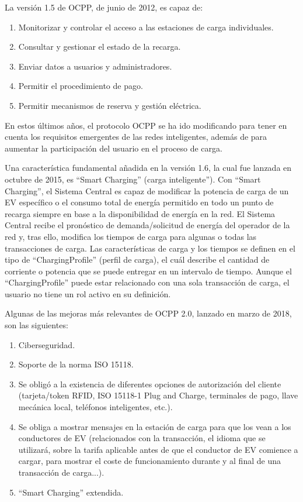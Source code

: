 \documentclass[12pt,a4paper,onecolumn,oneside]{report}
\begin{document}
La versión 1.5 de OCPP, de junio de 2012, es capaz de:

\begin{enumerate}

\item Monitorizar y controlar el acceso a las estaciones de carga individuales.
\item Consultar y gestionar el estado de la recarga.
\item Enviar datos a usuarios y administradores.
\item Permitir el procedimiento de pago.
\item Permitir mecanismos de reserva y gestión eléctrica.

\end{enumerate}

En estos últimos años, el protocolo OCPP se ha ido modificando para tener en cuenta los requisitos emergentes de las redes inteligentes, además de para aumentar la participación del usuario en el proceso de carga.

Una característica fundamental añadida en la versión 1.6, la cual fue lanzada en octubre de 2015, es ``Smart Charging” (carga inteligente”). Con ``Smart Charging”,  el Sistema Central es capaz de modificar la potencia de carga de un EV específico o el consumo total de energía permitido en todo un punto de recarga siempre en base a la disponibilidad de energía en la red. El Sistema Central recibe el pronóstico de demanda/solicitud de energía del operador de la red y, tras ello, modifica los tiempos de carga para algunas o todas las transacciones de carga. Las características de carga y los tiempos se definen en el tipo de ``ChargingProfile” (perfil de carga), el cuál describe el cantidad de corriente o potencia que se puede entregar en un intervalo de tiempo. Aunque el ``ChargingProfile” puede estar relacionado con una sola transacción de carga, el usuario no tiene un rol activo en su definición.

Algunas de las mejoras más relevantes de OCPP 2.0, lanzado en marzo de 2018, son las siguientes:

\begin{enumerate}

\item Ciberseguridad.
\item Soporte de la norma ISO 15118.
\item Se obligó a la existencia de diferentes opciones de autorización del cliente (tarjeta/token RFID, ISO 15118-1 Plug and Charge, terminales de pago, llave mecánica local, teléfonos inteligentes, etc.).
\item Se obliga a mostrar mensajes en la estación de carga para que los vean a los conductores de EV (relacionados con la transacción, el idioma que se utilizará, sobre la tarifa aplicable antes de que el conductor de EV comience a cargar, para mostrar el coste de funcionamiento durante y al final de una transacción de carga...).
\item ``Smart Charging” extendida.

\end{enumerate}
\end{document}
